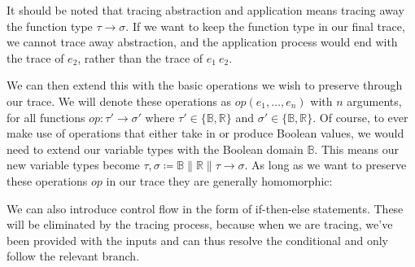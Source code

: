         It should be noted that tracing abstraction and application means tracing away the function type $\tau\to\sigma$.
        If we want to keep the function type in our final trace, we cannot trace away abstraction, and the application process would end with the trace of $e_2$, rather than the trace of $e_1\ e_2$.

        We can then extend this with the basic operations we wish to preserve through our trace.
        We will denote these operations as $op(e_1,\dots,e_n)$ with $n$ arguments, for all functions $op:\tau'\to\sigma'$ where $\tau'\in\{\mathbb{B},\mathbb{R}\}$ and $\sigma'\in\{\mathbb{B},\mathbb{R}\}$.
        Of course, to ever make use of operations that either take in or produce Boolean values, we would need to extend our variable types with the Boolean domain $\mathbb{B}$.
        This means our new variable types become $\tau,\sigma\coloneqq\mathbb{B}\|\mathbb{R}\|\tau\to\sigma$.
        As long as we want to preserve these operations $op$ in our trace they are generally homomorphic:

        \begin{prooftree}
        \end{prooftree}

        \begin{prooftree}
        \end{prooftree}

        We can also introduce control flow in the form of if-then-else statements.
        These will be eliminated by the tracing process, because when we are tracing, we've been provided with the inputs and can thus resolve the conditional and only follow the relevant branch.
        
        \begin{prooftree}
        \end{prooftree}


